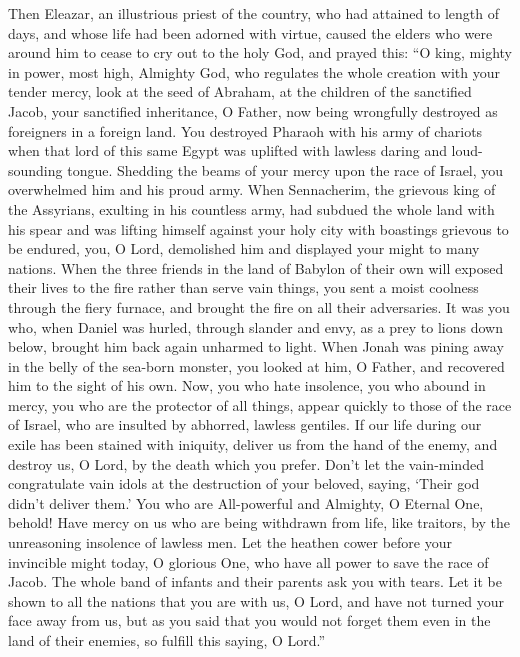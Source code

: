  Then Eleazar, an illustrious priest of the country, who
had attained to length of days, and whose life had been adorned with
virtue, caused the elders who were around him to cease to cry out to the
holy God, and prayed this:  ``O king, mighty in power,
most high, Almighty God, who regulates the whole creation with your
tender mercy,  look at the seed of Abraham, at the
children of the sanctified Jacob, your sanctified inheritance, O Father,
now being wrongfully destroyed as foreigners in a foreign land.
 You destroyed Pharaoh with his army of chariots when that
lord of this same Egypt was uplifted with lawless daring and
loud-sounding tongue. Shedding the beams of your mercy upon the race of
Israel, you overwhelmed him and his proud army.  When
Sennacherim, the grievous king of the Assyrians, exulting in his
countless army, had subdued the whole land with his spear and was
lifting himself against your holy city with boastings grievous to be
endured, you, O Lord, demolished him and displayed your might to many
nations.  When the three friends in the land of Babylon of
their own will exposed their lives to the fire rather than serve vain
things, you sent a moist coolness through the fiery furnace, and brought
the fire on all their adversaries.  It was you who, when
Daniel was hurled, through slander and envy, as a prey to lions down
below, brought him back again unharmed to light.  When
Jonah was pining away in the belly of the sea-born monster, you looked
at him, O Father, and recovered him to the sight of his own.
 Now, you who hate insolence, you who abound in mercy, you
who are the protector of all things, appear quickly to those of the race
of Israel, who are insulted by abhorred, lawless gentiles.
 If our life during our exile has been stained with
iniquity, deliver us from the hand of the enemy, and destroy us, O Lord,
by the death which you prefer.  Don't let the vain-minded
congratulate vain idols at the destruction of your beloved, saying,
`Their god didn't deliver them.'  You who are
All-powerful and Almighty, O Eternal One, behold! Have mercy on us who
are being withdrawn from life, like traitors, by the unreasoning
insolence of lawless men.  Let the heathen cower before
your invincible might today, O glorious One, who have all power to save
the race of Jacob.  The whole band of infants and their
parents ask you with tears.  Let it be shown to all the
nations that you are with us, O Lord, and have not turned your face away
from us, but as you said that you would not forget them even in the land
of their enemies, so fulfill this saying, O Lord.''

